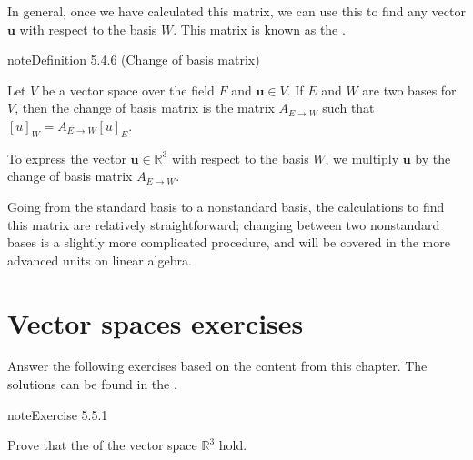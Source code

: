 \documentclass[letterpaper,10pt,english]{jupyterBook}
\begin{document}
\sphinxAtStartPar
In general, once we have calculated this matrix, we can use this to find any vector \(\mathbf{u}\) with respect to the basis \(W\). This matrix is known as the .

\ignorespaces \label{_pages/5.4_Basis:change-of-basis-matrix-definition}
\begin{sphinxadmonition}{note}{Definition 5.4.6 (Change of basis matrix)}



\sphinxAtStartPar
Let \(V\) be a vector space over the field \(F\) and \(\mathbf{u} \in V\). If \(E\) and \(W\) are two bases for \(V\), then the change of basis matrix is the matrix \(A_{E \to W}\) such that \([u]_{W} = A_{E \to W} [u]_E\).
\end{sphinxadmonition}

\sphinxAtStartPar
To express the vector \(\mathbf{u} \in \mathbb{R}^3\) with respect to the basis \(W\), we multiply \(\mathbf{u}\) by the change of basis matrix \(A_{E \to W}\).

\sphinxAtStartPar
Going from the standard basis to a non\sphinxhyphen{}standard basis, the calculations to find this matrix are relatively straightforward; changing between two non\sphinxhyphen{}standard bases is a slightly more complicated procedure, and will be covered in the more advanced units on linear algebra.

\sphinxstepscope


\section{Vector spaces exercises}
\label{\detokenize{_pages/5.5_Vector_spaces_exercises:vector-spaces-exercises}}\label{\detokenize{_pages/5.5_Vector_spaces_exercises:vector-spaces-exercises-section}}\label{\detokenize{_pages/5.5_Vector_spaces_exercises::doc}}
\sphinxAtStartPar
Answer the following exercises based on the content from this chapter. The solutions can be found in the {\hyperref[\detokenize{_pages/A5_Vector_spaces_exercises_solutions:vector-spaces-exercises-solutions-section}]{}}.
 \label{exercise:vector-spaces-ex-R3-axioms}

\begin{sphinxadmonition}{note}{Exercise 5.5.1}



\sphinxAtStartPar
Prove that the {\hyperref[\detokenize{_pages/5.1_Vector_spaces_definitions:vector-space-axioms}]{}} of the vector space \(\mathbb{R}^3\) hold.
\end{sphinxadmonition}
 \label{exercise:vector-spaces-ex-R3-subspaces}
\end{document}
